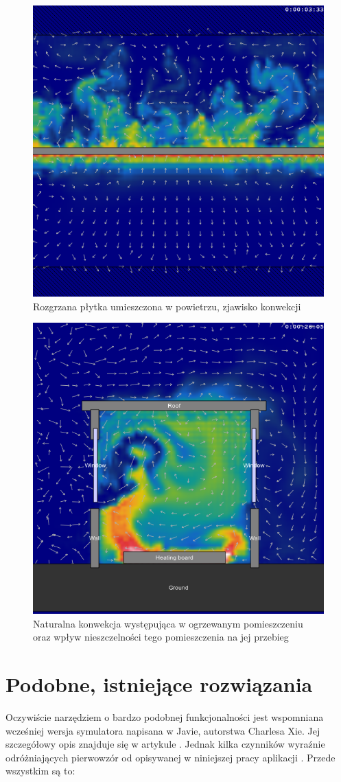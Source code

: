 \begin{figure}[!h]
\centering
\includegraphics[width=.6\textwidth]{img/fluidExample1}
\caption{Rozgrzana płytka umieszczona w powietrzu, zjawisko konwekcji}
\label{fig:fluidExample1}
\end{figure}

\begin{figure}[!h]
\centering
\includegraphics[width=.6\textwidth]{img/fluidExample2}
\caption{Naturalna konwekcja występująca w ogrzewanym pomieszczeniu oraz wpływ 
nieszczelności tego pomieszczenia na jej przebieg}
\label{fig:fluidExample2}
\end{figure}

\section{Podobne, istniejące rozwiązania}

Oczywiście narzędziem o bardzo podobnej funkcjonalności jest wspomniana
wcześniej wersja symulatora \en napisana w Javie, autorstwa Charlesa Xie. Jej
szczegółowy opis znajduje się w artykule \cite{orgEnergy2D}. Jednak kilka
czynników wyraźnie odróżniających pierwowzór od opisywanej w niniejszej pracy
aplikacji \en. Przede wszystkim są to:

